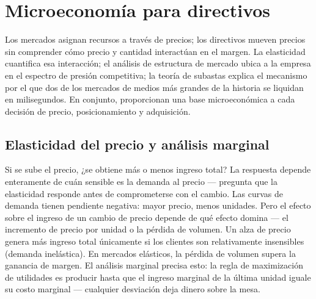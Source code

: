 \chapter{Microeconomía para directivos}\label{ch:microeconomics}


Los mercados asignan recursos a través de precios; los directivos mueven precios sin comprender cómo
precio y cantidad interactúan en el margen. La elasticidad cuantifica esa interacción; el análisis
de estructura de mercado ubica a la empresa en el espectro de presión competitiva; la teoría de
subastas explica el mecanismo por el que dos de los mercados de medios más grandes de la historia
se liquidan en milisegundos. En conjunto, proporcionan una base microeconómica a cada decisión de
precio, posicionamiento y adquisición.

\section{Elasticidad del precio y análisis marginal}\label{sec:elasticity}

Si se sube el precio, ¿se obtiene más o menos ingreso total? La respuesta depende enteramente de
cuán sensible es la demanda al precio --- pregunta que la elasticidad responde antes de comprometerse
con el cambio. Las curvas de demanda tienen pendiente negativa: mayor precio, menos unidades. Pero
el efecto sobre el ingreso de un cambio de precio depende de qué efecto domina --- el incremento
de precio por unidad o la pérdida de volumen. Un alza de precio genera más ingreso total únicamente
si los clientes son relativamente insensibles (demanda inelástica). En mercados elásticos, la
pérdida de volumen supera la ganancia de margen. El análisis marginal precisa esto: la regla de
maximización de utilidades es producir hasta que el ingreso marginal de la última unidad iguale su
costo marginal --- cualquier desviación deja dinero sobre la mesa.


